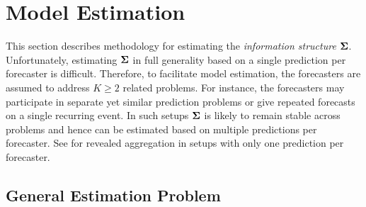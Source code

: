 \documentclass[11pt]{article}
\theoremstyle{definition}
\theoremstyle{definition}
\def\bSigma{{\bf \Sigma}}
\begin{document}
\section{Model Estimation}
\label{estimator}
This section describes methodology for estimating the \textit{information structure} $\bSigma$.  
Unfortunately, estimating $\bSigma$ in full generality based on a single prediction per forecaster is difficult. Therefore, to facilitate model estimation, the forecasters are assumed to address $K \geq 2$ related problems. For instance, the forecasters may participate in separate yet similar prediction problems or give repeated forecasts on a single recurring event. In such setups $\bSigma$ is likely to remain stable across problems and hence can be estimated based on multiple predictions per forecaster. See \cite{satopaamodeling} for revealed aggregation in setups with only one prediction per forecaster. 








\subsection{General Estimation Problem}
\label{generalEstimation}
\end{document}
